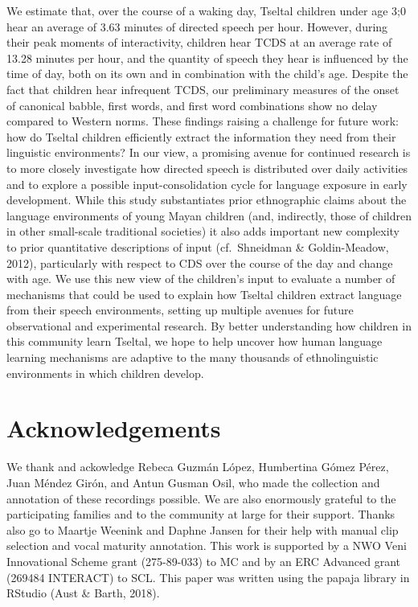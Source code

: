 \documentclass[floatsintext,man]{apa6}
\theoremstyle{definition}
\theoremstyle{definition}
\theoremstyle{definition}
\theoremstyle{remark}
\begin{document}
We estimate that, over the course of a waking day, Tseltal children
under age 3;0 hear an average of 3.63 minutes of directed speech per
hour. However, during their peak moments of interactivity, children hear
TCDS at an average rate of 13.28 minutes per hour, and the quantity of
speech they hear is influenced by the time of day, both on its own and
in combination with the child's age. Despite the fact that children hear
infrequent TCDS, our preliminary measures of the onset of canonical
babble, first words, and first word combinations show no delay compared
to Western norms. These findings raising a challenge for future work:
how do Tseltal children efficiently extract the information they need
from their linguistic environments? In our view, a promising avenue for
continued research is to more closely investigate how directed speech is
distributed over daily activities and to explore a possible
input-consolidation cycle for language exposure in early development.
While this study substantiates prior ethnographic claims about the
language environments of young Mayan children (and, indirectly, those of
children in other small-scale traditional societies) it also adds
important new complexity to prior quantitative descriptions of input
(cf.~Shneidman \& Goldin-Meadow, 2012), particularly with respect to CDS
over the course of the day and change with age. We use this new view of
the children's input to evaluate a number of mechanisms that could be
used to explain how Tseltal children extract language from their speech
environments, setting up multiple avenues for future observational and
experimental research. By better understanding how children in this
community learn Tseltal, we hope to help uncover how human language
learning mechanisms are adaptive to the many thousands of
ethnolinguistic environments in which children develop.

\section{Acknowledgements}\label{acknowledgements}

We thank and ackowledge Rebeca Guzmán López, Humbertina Gómez Pérez,
Juan Méndez Girón, and Antun Gusman Osil, who made the collection and
annotation of these recordings possible. We are also enormously grateful
to the participating families and to the community at large for their
support. Thanks also go to Maartje Weenink and Daphne Jansen for their
help with manual clip selection and vocal maturity annotation. This work
is supported by a NWO Veni Innovational Scheme grant (275-89-033) to MC
and by an ERC Advanced grant (269484 INTERACT) to SCL. This paper was
written using the papaja library in RStudio (Aust \& Barth, 2018).
\end{document}
